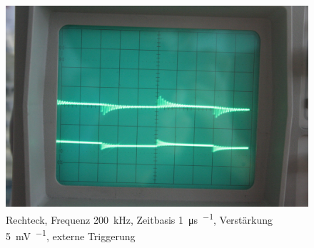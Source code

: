 \begin{figure}
	\centering
	\begin{minipage}{.45\linewidth}
	\end{minipage}
	\hfill
	\begin{minipage}{.45\linewidth}
	\includegraphics[width=\linewidth]{Fotos/IMG_0756-1500.jpg}
	\end{minipage}
	\caption{%
		Rechteck, Frequenz \SI{200}{\kilo\hertz}, Zeitbasis \SI{1}{\micro\second\per\division}, Verstärkung \SI{5}{\milli\volt\per\division}, externe Triggerung
	}
	\label{fig:0756}
\end{figure}

